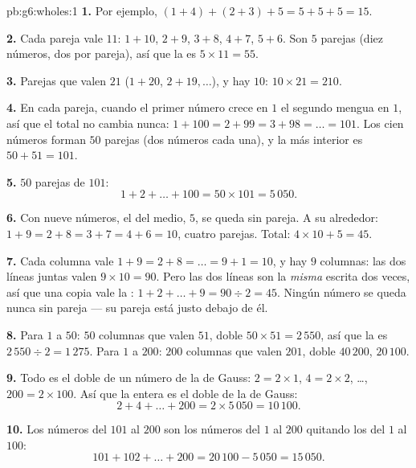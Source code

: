 \begin{solution}{pb:g6:wholes:1}
\textbf{1.} Por ejemplo, $(1 + 4) + (2 + 3) + 5 = 5 + 5 + 5 =
15$.

\textbf{2.} Cada pareja vale $11$: $1 + 10$, $2 + 9$, $3 + 8$,
$4 + 7$, $5 + 6$. Son $5$ parejas (diez números, dos por pareja),
así que la  es $5 \times 11 = 55$.

\textbf{3.} Parejas que valen $21$ ($1 + 20$, $2 + 19, \dots$), y
hay $10$: $10 \times 21 = 210$.

\textbf{4.} En cada pareja, cuando el primer número crece en $1$ el
segundo mengua en $1$, así que el total no cambia nunca:
$1 + 100 = 2 + 99 = 3 + 98 = \dots = 101$. Los cien números
forman $50$ parejas (dos números cada una), y la más interior es
$50 + 51 = 101$.

\textbf{5.} $50$ parejas de $101$:
\[
1 + 2 + \dots + 100 = 50 \times 101 = 5\,050 .
\]

\textbf{6.} Con nueve números, el del medio, $5$, se queda sin
pareja. A su alrededor: $1 + 9 = 2 + 8 = 3 + 7 = 4 + 6 = 10$, cuatro
parejas. Total: $4 \times 10 + 5 = 45$.

\textbf{7.} Cada columna vale $1 + 9 = 2 + 8 = \dots =
9 + 1 = 10$, y hay $9$ columnas: las dos líneas juntas
valen $9 \times 10 = 90$. Pero las dos líneas son la
\emph{misma}  escrita dos veces, así que una copia vale la :
$1 + 2 + \dots + 9 = 90 \div 2 = 45$. Ningún número se queda nunca
sin pareja --- su pareja está justo debajo de él.

\textbf{8.} Para $1$ a $50$: $50$ columnas que valen $51$,  doble
$50 \times 51 = 2\,550$, así que la  es $2\,550 \div 2 = 1\,275$.
Para $1$ a $200$: $200$ columnas que valen $201$,  doble
$40\,200$,  $20\,100$.

\textbf{9.} Todo  es el doble de un número de
la  de Gauss: $2 = 2 \times 1$, $4 = 2 \times 2$, \dots,
$200 = 2 \times 100$. Así que la  entera es el doble de la de Gauss:
\[
2 + 4 + \dots + 200 = 2 \times 5\,050 = 10\,100 .
\]

\textbf{10.} Los números del $101$ al $200$ son los números del
$1$ al $200$ quitando los del $1$ al $100$:
\[
101 + 102 + \dots + 200 = 20\,100 - 5\,050 = 15\,050 .
\]


\end{solution}
